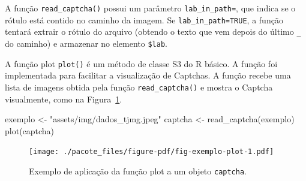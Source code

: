 \documentclass[12pt,twoside,brazilian]{book}
\newenvironment{Shaded}{\begin{snugshade}}{\end{snugshade}}
\newcommand{\AttributeTok}[1]{\textcolor[rgb]{0.40,0.45,0.13}{#1}}
\newcommand{\CommentTok}[1]{\textcolor[rgb]{0.37,0.37,0.37}{#1}}
\newcommand{\ConstantTok}[1]{\textcolor[rgb]{0.56,0.35,0.01}{#1}}
\newcommand{\FunctionTok}[1]{\textcolor[rgb]{0.28,0.35,0.67}{#1}}
\newcommand{\NormalTok}[1]{\textcolor[rgb]{0.00,0.23,0.31}{#1}}
\newcommand{\OtherTok}[1]{\textcolor[rgb]{0.00,0.23,0.31}{#1}}
\newcommand{\StringTok}[1]{\textcolor[rgb]{0.13,0.47,0.30}{#1}}
\begin{document}
A função \texttt{read\_captcha()} possui um parâmetro
\texttt{lab\_in\_path=}, que indica se o rótulo está contido no caminho
da imagem. Se \texttt{lab\_in\_path=TRUE}, a função tentará extrair o
rótulo do arquivo (obtendo o texto que vem depois do último \texttt{\_}
do caminho) e armazenar no elemento \texttt{\$lab}.

\begin{Shaded}
\end{Shaded}

A função plot \texttt{plot()} é um método de classe S3 do R básico. A
função foi implementada para facilitar a visualização de Captchas. A
função recebe uma lista de imagens obtida pela função
\texttt{read\_captcha()} e mostra o Captcha visualmente, como na
Figura~\ref{fig-exemplo-plot}.

\begin{Shaded}
\begin{Highlighting}[]
\NormalTok{exemplo }\OtherTok{\textless{}{-}} \StringTok{"assets/img/dados\_tjmg.jpeg"}
\NormalTok{captcha }\OtherTok{\textless{}{-}} \FunctionTok{read\_captcha}\NormalTok{(exemplo)}
\FunctionTok{plot}\NormalTok{(captcha)}
\end{Highlighting}
\end{Shaded}

\begin{figure}[H]

{\centering \texttt{[image: ./pacote\_files/figure-pdf/fig-exemplo-plot-1.pdf]}

}

\caption{\label{fig-exemplo-plot}Exemplo de aplicação da função plot a
um objeto \texttt{captcha}.}

\end{figure}
\end{document}
